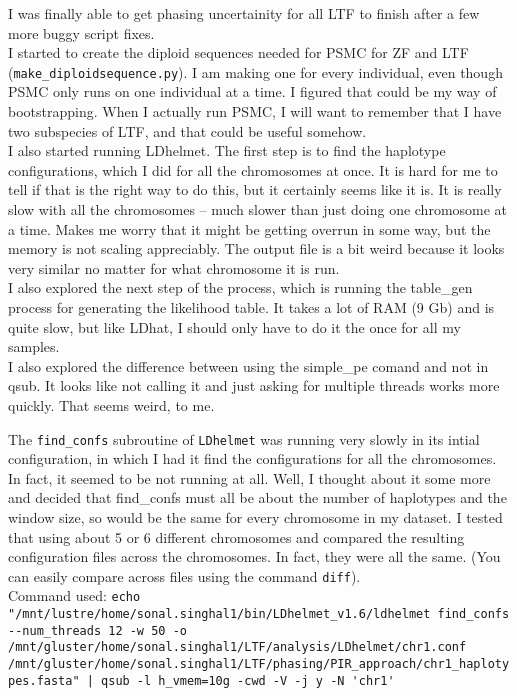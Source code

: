 \documentclass[idxtotoc,hyperref,openany,oneside]{labbook} %
\begin{document}
I was finally able to get phasing uncertainity for all LTF to finish after a few more buggy script fixes. \\

I started to create the diploid sequences needed for PSMC for ZF and LTF (\verb+make_diploidsequence.py+). I am making one for every individual, even though PSMC only runs on one individual at a time. I figured that could be my way of bootstrapping. When I actually run PSMC, I will want to remember that I have two subspecies of LTF, and that could be useful somehow. \\

I also started running LDhelmet. The first step is to find the haplotype configurations, which I did for all the chromosomes at once. It is hard for me to tell if that is the right way to do this, but it certainly seems like it is. It is really slow with all the chromosomes -- much slower than just doing one chromosome at a time. Makes me worry that it might be getting overrun in some way, but the memory is not scaling appreciably. The output file is a bit weird because it looks very similar no matter for what chromosome it is run. \\

I also explored the next step of the process, which is running the table\_gen process for generating the likelihood table. It takes a lot of RAM (9 Gb) and is quite slow, but like LDhat, I should only have to do it the once for all my samples. \\

I also explored the difference between using the simple\_pe comand and not in qsub. It looks like not calling it and just asking for multiple threads works more quickly. That seems weird, to me.

The \verb+find_confs+ subroutine of \verb+LDhelmet+ was running very slowly in its intial configuration, in which I had it find the configurations for all the chromosomes. In fact, it seemed to be not running at all. Well, I thought about it some more and decided that find\_confs must all be about the number of haplotypes and the window size, so would be the same for every chromosome in my dataset. I tested that using about 5 or 6 different chromosomes and compared the resulting configuration files across the chromosomes. In fact, they were all the same. (You can easily compare across files using the command \verb+diff+). \\

Command used: \verb+echo "/mnt/lustre/home/sonal.singhal1/bin/LDhelmet_v1.6/ldhelmet find_confs --num_threads 12 -w 50 -o /mnt/gluster/home/sonal.singhal1/LTF/analysis/LDhelmet/chr1.conf /mnt/gluster/home/sonal.singhal1/LTF/phasing/PIR_approach/chr1_haplotypes.fasta" | qsub -l h_vmem=10g -cwd -V -j y -N 'chr1'+ \\
\end{document}
